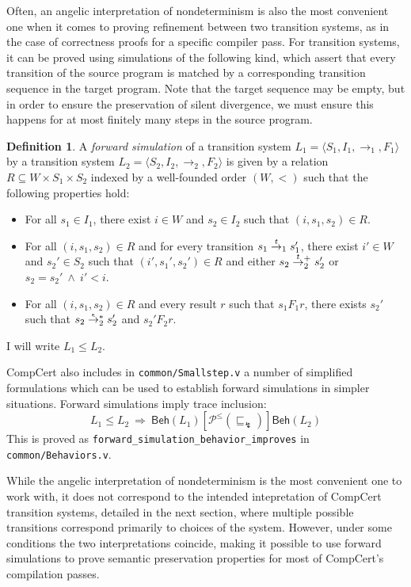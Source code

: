 \documentclass[11pt,oneside,draft]{book}
\theoremstyle{definition}
\newtheorem{definition}[theorem]{Definition}
\newcommand{\kw}[1]{\ensuremath{ \mathsf{#1} }}
\newcommand{\ifr}[1]{\mathrel{[{#1}]}}
\newcommand{\refby}{\sqsubseteq} %
\begin{document}
Often,
an angelic interpretation of nondeterminism
is also the most convenient one
when it comes to proving refinement between
two transition systems,
as in the case of correctness proofs for
a specific compiler pass.
For transition systems,
it can be proved using simulations of the following kind,
which assert that every transition of the source program
is matched by a corresponding transition sequence in the target program.
Note that the target sequence may be empty,
but in order to ensure the preservation of silent divergence,
we must ensure this happens for at most
finitely many steps in the source program.

\begin{definition}
A \emph{forward simulation}
of a transition system
$L_1 = \langle S_1, I_1, {\rightarrow}_1, F_1 \rangle$
by a transition system
$L_2 = \langle S_2, I_2, {\rightarrow}_2, F_2 \rangle$
is given by a relation $R \subseteq W \times S_1 \times S_2$
indexed by a well-founded order $(W, {<})$
such that the following properties hold:
\begin{itemize}
  \item For all $s_1 \in I_1$,
    there exist $i \in W$ and $s_2 \in I_2$
    such that $(i, s_1, s_2) \in R$.
  \item For all $(i, s_1, s_2) \in R$
    and for every transition
    $s_1 \mathrel{\smash{\stackrel{t}{\rightarrow}}_1} s_1'$,
    there exist $i' \in W$ and $s_2' \in S_2$
    such that $(i', s_1', s_2') \in R$ and either
    $s_2 \mathrel{\smash{\stackrel{t}{\rightarrow}}_2^+} s_2'$ or
    $s_2 = s_2' \:\wedge\: i' < i$.
  \item For all $(i, s_1, s_2) \in R$
    and every result $r$ such that $s_1 \mathrel{F_1} r$,
    there exists $s_2'$ such that
    $s_2 \mathrel{\smash{\stackrel{\epsilon}{\rightarrow}}_2^*} s_2'$ and
    $s_2' \mathrel{F_2} r$.
\end{itemize}
I will write $L_1 \le L_2$.
\end{definition}

CompCert also includes in \texttt{common/Smallstep.v}
a number of simplified formulations
which can be used to establish forward simulations
in simpler situations.
Forward simulations imply trace inclusion:
\[
  L_1 \le L_2
  \: \Rightarrow \:
  \kw{Beh}(L_1) \ifr{\mathcal{P}^\le(\refby_\lightning)} \kw{Beh}(L_2)
\]
This is proved as \texttt{forward\_simulation\_behavior\_improves}
in \texttt{common/Behaviors.v}.

While the angelic interpretation
of nondeterminism is the most convenient one to work with,
it does not correspond to the intended intepretation
of CompCert transition systems,
detailed in the next section,
where multiple possible transitions correspond
primarily to choices of the system.
However,
under some conditions
the two interpretations coincide,
making it possible to use forward simulations
to prove semantic preservation properties
for most of CompCert's compilation passes.
\end{document}
